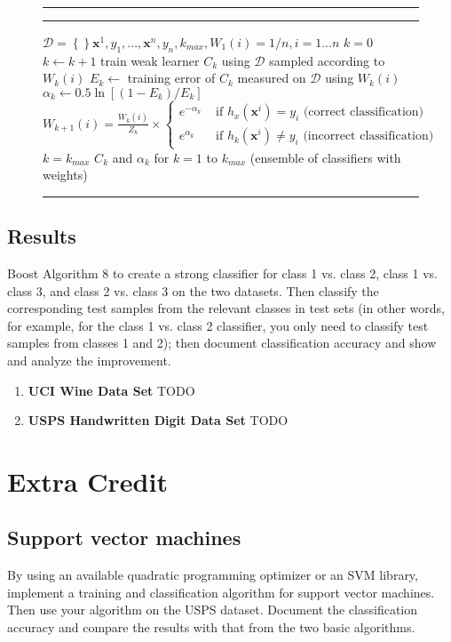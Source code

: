 \documentclass{article}
\newcommand{\mbrace}[1][ ]{\ensuremath{\left\{#1\right\}}}
\newcommand{\mbf}[1]{\ensuremath{\mathbf{#1}}}
\newcommand{\mc}[1]{\ensuremath{\mathcal{#1}}}
\newcommand{\algtab}{\hspace{\algorithmicindent}}
\newcommand{\algtitle}[1]{\smallskip\hrule\smallskip{\bf #1}\smallskip\hrule}
\newenvironment{algo}[1]
{\noindent\ignorespaces\algtitle{#1}\begin{algorithmic}[1]}
{\end{algorithmic}\hrule\smallskip\ignorespacesafterend}
\begin{document}
\begin{figure}[H]
\begin{algo}{Algorithm 9.1 (AdaBoost)}
\newcommand{\mbx}{\mbf{x}}
 $\mc{D} = \mbrace{\mbx^1, y_1, ..., \mbx^n, y_n}, k_{max}, W_1(i) = 1/n, i = 1...n$
\State $k = 0$
 ~$k \gets k+1$
\State\algtab train weak learner $C_k$ using \mc{D} sampled according to $W_k(i)$
\State\algtab $E_k \gets$ training error of $C_k$ measured on \mc{D} using $W_k(i)$
\State\algtab $\alpha_k \gets 0.5 \ln\left[ (1-E_k) / E_k \right]$
\State\algtab $W_{k+1}(i) = \frac{W_k(i)}{Z_k} \times \begin{cases}
e^{-\alpha_k} & \text{ if } h_x(\mbx^i) = y_i \text{ (correct classification)}\\
e^{\alpha_k} & \text{ if } h_k(\mbx^i) \neq y_i \text{ (incorrect classification)}
\end{cases}$
 $k = k_{max}$
 $C_k$ and $\alpha_k$ for $k = 1$ to $k_{max}$ (ensemble of classifiers with weights)
\end{algo}
\end{figure}

\subsection{Results}
Boost Algorithm 8 to create a strong classifier for class 1 vs. class 2, class 1 vs. class 3, and class 2 vs. class 3 on the two datasets. Then classify the corresponding test samples from the relevant classes in test sets (in other words, for example, for the class 1 vs. class 2 classifier, you only need to classify test samples from classes 1 and 2); then document classification accuracy and show and analyze the improvement.

\begin{enumerate}
\item {\bf UCI Wine Data Set}
{\large TODO}
\item {\bf USPS Handwritten Digit Data Set}
{\large TODO}
\end{enumerate}


\section{Extra Credit}
\subsection{Support vector machines}
By using an available quadratic programming optimizer or an SVM library, implement a training and classification algorithm for support vector machines. Then use your algorithm on the USPS dataset. Document the classification accuracy and compare the results with that from the two basic algorithms.
\end{document}
